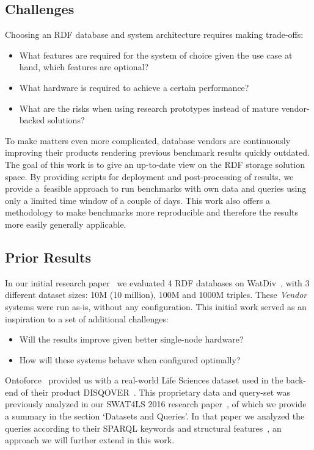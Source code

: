 \subsection{Challenges}
Choosing an RDF database and system architecture requires making trade-offs: 

\begin{itemize}
	\item What features are required for the system of choice given the use case at hand, which features are optional?
	\item What hardware is required to achieve a certain performance?
	\item What are the risks when using research prototypes instead of mature vendor-backed solutions? 
\end{itemize}

To make matters even more complicated, database vendors are continuously improving their products rendering previous benchmark results quickly outdated.
The goal of this work is to give an up-to-date view on the RDF storage solution space.
By providing scripts for deployment and post-processing of results, we provide a~feasible approach to run benchmarks with own data and queries using only a limited time window of a couple of days.
This work also offers a methodology to make benchmarks more reproducible and therefore the results more easily generally applicable.

\subsection{Prior Results}
In our initial research paper~\cite{de2016big} we evaluated 4 RDF databases on WatDiv~\cite{alucc2014diversified}, with 3 different dataset sizes: 10M (10 million), 100M and 1000M triples. These \emph{Vendor} systems were run as-is, without any configuration. 
This initial work served as an inspiration to a set of additional challenges:

\begin{itemize}
\item Will the results improve given better single-node hardware?
\item How will these systems behave when configured optimally?
\end{itemize}

Ontoforce~\cite{ontoforcewebsite} provided us with a real-world Life \mbox{Sciences} dataset used in the back-end of their product \mbox{DISQOVER~\cite{disqover}}. This proprietary data and query-set was previously analyzed in our SWAT4LS 2016 research paper~\cite{dewitte_swat4ls_2016}, of which we provide a summary in the section `Datasets and Queries'. 
In that paper we analyzed the queries according to their SPARQL keywords and structural features~\cite{DBLP:journals/corr/abs-1103-5043}, an approach we will further extend in this work. 

